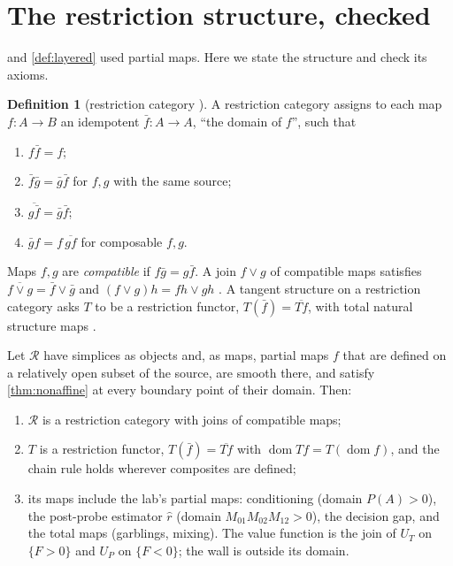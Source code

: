 \documentclass[11pt]{article}
\theoremstyle{definition}\newtheorem{definition}[theorem]{Definition}\newtheorem{remark}[theorem]{Remark}\newtheorem{example}[theorem]{Example}
\begin{document}
\section{The restriction structure, checked}\label{sec:restriction}
 and \cref{def:layered} used partial maps. Here we state the structure and check its axioms.

\begin{definition}[restriction category \cite{CockettLack2002}]\label{def:restriction}
A restriction category assigns to each map $f:A\to B$ an idempotent $\bar f:A\to A$, ``the domain of $f$'', such that
\begin{enumerate}[label=(R\arabic*)]
\item $f\bar f=f$;
\item $\bar f\bar g=\bar g\bar f$ for $f,g$ with the same source;
\item $\overline{g\bar f}=\bar g\bar f$;
\item $\bar gf=f\,\overline{gf}$ for composable $f,g$.
\end{enumerate}
Maps $f,g$ are \emph{compatible} if $f\bar g=g\bar f$. A join $f\vee g$ of compatible maps satisfies $\overline{f\vee g}=\bar f\vee\bar g$ and
$(f\vee g)h=fh\vee gh$ \cite{GuoThesis2012}. A tangent structure on a restriction category asks $T$ to be a restriction functor,
$T(\bar f)=\overline{Tf}$, with total natural structure maps \cite{CockettCruttwellGallagher2011,CockettCruttwell2014}.
\end{definition}

\begin{proposition}\label{prop:restriction}
Let $\mathcal R$ have simplices as objects and, as maps, partial maps $f$ that are defined on a relatively open subset of the source, are
smooth there, and satisfy \cref{thm:nonaffine} at every boundary point of their domain. Then:
\begin{enumerate}
\item[(1)] $\mathcal R$ is a restriction category with joins of compatible maps;
\item[(2)] $T$ is a restriction functor, $T(\bar f)=\overline{Tf}$ with $\operatorname{dom}Tf=T(\operatorname{dom}f)$, and the chain rule holds
  wherever composites are defined;
\item[(3)] its maps include the lab's partial maps: conditioning (domain $P(A)>0$), the post-probe estimator $\hat r$ (domain
  $M_{01}M_{02}M_{12}>0$), the decision gap, and the total maps (garblings, mixing). The value function is the join of $U_T$ on
  $\{F>0\}$ and $U_P$ on $\{F<0\}$; the wall is outside its domain.
\end{enumerate}
\end{proposition}
\end{document}
